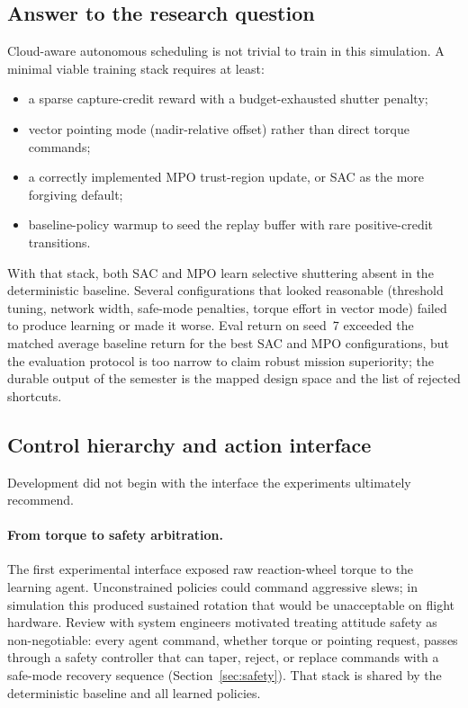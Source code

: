 \subsection{Answer to the research question}
\label{sec:discussion-answer}

Cloud-aware autonomous scheduling is not trivial to train in this simulation.
A minimal viable training stack requires at least:
\begin{itemize}
  \item a sparse capture-credit reward with a budget-exhausted shutter penalty;
  \item vector pointing mode (nadir-relative offset) rather than direct torque commands;
  \item a correctly implemented MPO trust-region update, or SAC as the more forgiving default;
  \item baseline-policy warmup to seed the replay buffer with rare positive-credit transitions.
\end{itemize}
With that stack, both SAC and MPO learn selective shuttering absent in the deterministic baseline.
Several configurations that looked reasonable (threshold tuning, network width, safe-mode penalties, torque effort in vector mode) failed to produce learning or made it worse.
Eval return on seed~7 exceeded the matched average baseline return for the best SAC and MPO configurations, but the evaluation protocol is too narrow to claim robust mission superiority; the durable output of the semester is the mapped design space and the list of rejected shortcuts.

\subsection{Control hierarchy and action interface}
\label{sec:discussion-architecture}

Development did not begin with the interface the experiments ultimately recommend.

\paragraph{From torque to safety arbitration.}
The first experimental interface exposed raw reaction-wheel torque to the learning agent.
Unconstrained policies could command aggressive slews; in simulation this produced sustained rotation that would be unacceptable on flight hardware.
Review with system engineers motivated treating attitude safety as non-negotiable: every agent command, whether torque or pointing request, passes through a safety controller that can taper, reject, or replace commands with a safe-mode recovery sequence (Section~\ref{sec:safety}).
That stack is shared by the deterministic baseline and all learned policies.

